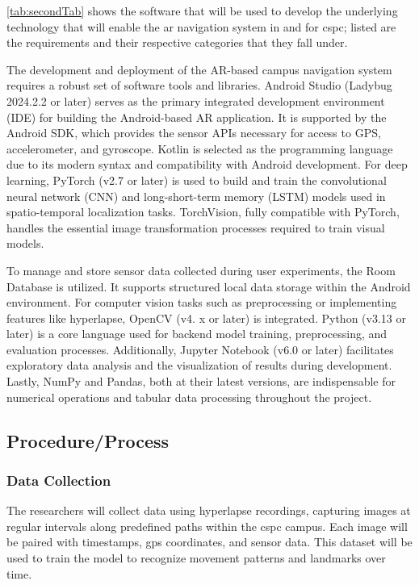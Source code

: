 \begin{refsection}
\ref{tab:secondTab} shows the software that will be used to develop the underlying technology that will enable the \gls{ar} navigation system in and for \gls{cspc}; listed are the requirements and their respective categories that they fall under.

The development and deployment of the AR-based campus navigation system requires a robust set of software tools and libraries. Android Studio (Ladybug 2024.2.2 or later) serves as the primary integrated development environment (IDE) for building the Android-based AR application. It is supported by the Android SDK, which provides the sensor APIs necessary for access to GPS, accelerometer, and gyroscope. Kotlin is selected as the programming language due to its modern syntax and compatibility with Android development. For deep learning, PyTorch (v2.7 or later) is used to build and train the convolutional neural network (CNN) and long-short-term memory (LSTM) models used in spatio-temporal localization tasks. TorchVision, fully compatible with PyTorch, handles the essential image transformation processes required to train visual models.

To manage and store sensor data collected during user experiments, the Room Database is utilized. It supports structured local data storage within the Android environment. For computer vision tasks such as preprocessing or implementing features like hyperlapse, OpenCV (v4. x or later) is integrated. Python (v3.13 or later) is a core language used for backend model training, preprocessing, and evaluation processes. Additionally, Jupyter Notebook (v6.0 or later) facilitates exploratory data analysis and the visualization of results during development. Lastly, NumPy and Pandas, both at their latest versions, are indispensable for numerical operations and tabular data processing throughout the project.

\subsection{Procedure/Process}

\subsubsection{Data Collection}

The researchers will collect data using hyperlapse recordings, capturing images at regular intervals along predefined paths within the \gls{cspc} campus. Each image will be paired with timestamps, \gls{gps} coordinates, and sensor data. This dataset will be used to train the model to recognize movement patterns and landmarks over time.


\end{refsection}
